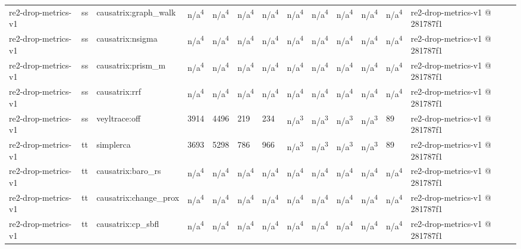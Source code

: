 \begin{table}[t]
\begin{tabular}{lllllllllllll}
re2-drop-metrics-v1 & ss & causatrix:graph\_walk & n/a\textsuperscript{4} & n/a\textsuperscript{4} & n/a\textsuperscript{4} & n/a\textsuperscript{4} & n/a\textsuperscript{4} & n/a\textsuperscript{4} & n/a\textsuperscript{4} & n/a\textsuperscript{4} & n/a\textsuperscript{4} & re2-drop-metrics-v1 @ 281787f1 \\
re2-drop-metrics-v1 & ss & causatrix:nsigma & n/a\textsuperscript{4} & n/a\textsuperscript{4} & n/a\textsuperscript{4} & n/a\textsuperscript{4} & n/a\textsuperscript{4} & n/a\textsuperscript{4} & n/a\textsuperscript{4} & n/a\textsuperscript{4} & n/a\textsuperscript{4} & re2-drop-metrics-v1 @ 281787f1 \\
re2-drop-metrics-v1 & ss & causatrix:prism\_m & n/a\textsuperscript{4} & n/a\textsuperscript{4} & n/a\textsuperscript{4} & n/a\textsuperscript{4} & n/a\textsuperscript{4} & n/a\textsuperscript{4} & n/a\textsuperscript{4} & n/a\textsuperscript{4} & n/a\textsuperscript{4} & re2-drop-metrics-v1 @ 281787f1 \\
re2-drop-metrics-v1 & ss & causatrix:rrf & n/a\textsuperscript{4} & n/a\textsuperscript{4} & n/a\textsuperscript{4} & n/a\textsuperscript{4} & n/a\textsuperscript{4} & n/a\textsuperscript{4} & n/a\textsuperscript{4} & n/a\textsuperscript{4} & n/a\textsuperscript{4} & re2-drop-metrics-v1 @ 281787f1 \\
re2-drop-metrics-v1 & ss & veyltrace:off & 3914 & 4496 & 219 & 234 & n/a\textsuperscript{3} & n/a\textsuperscript{3} & n/a\textsuperscript{3} & n/a\textsuperscript{3} & 89 & re2-drop-metrics-v1 @ 281787f1 \\
re2-drop-metrics-v1 & tt & simplerca & 3693 & 5298 & 786 & 966 & n/a\textsuperscript{3} & n/a\textsuperscript{3} & n/a\textsuperscript{3} & n/a\textsuperscript{3} & 89 & re2-drop-metrics-v1 @ 281787f1 \\
re2-drop-metrics-v1 & tt & causatrix:baro\_rs & n/a\textsuperscript{4} & n/a\textsuperscript{4} & n/a\textsuperscript{4} & n/a\textsuperscript{4} & n/a\textsuperscript{4} & n/a\textsuperscript{4} & n/a\textsuperscript{4} & n/a\textsuperscript{4} & n/a\textsuperscript{4} & re2-drop-metrics-v1 @ 281787f1 \\
re2-drop-metrics-v1 & tt & causatrix:change\_prox & n/a\textsuperscript{4} & n/a\textsuperscript{4} & n/a\textsuperscript{4} & n/a\textsuperscript{4} & n/a\textsuperscript{4} & n/a\textsuperscript{4} & n/a\textsuperscript{4} & n/a\textsuperscript{4} & n/a\textsuperscript{4} & re2-drop-metrics-v1 @ 281787f1 \\
re2-drop-metrics-v1 & tt & causatrix:cp\_sbfl & n/a\textsuperscript{4} & n/a\textsuperscript{4} & n/a\textsuperscript{4} & n/a\textsuperscript{4} & n/a\textsuperscript{4} & n/a\textsuperscript{4} & n/a\textsuperscript{4} & n/a\textsuperscript{4} & n/a\textsuperscript{4} & re2-drop-metrics-v1 @ 281787f1 \\

\end{tabular}
\end{table}
